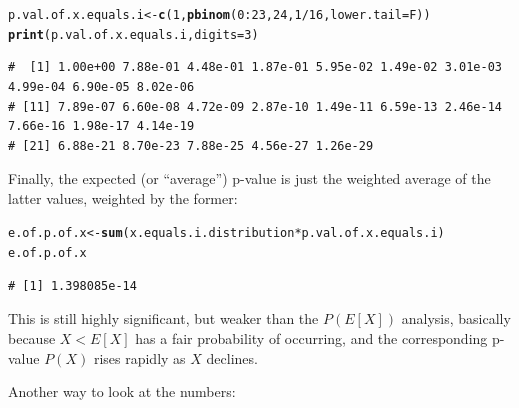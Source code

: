 \documentclass{article}\usepackage[]{graphicx}\usepackage[]{color}
\makeatletter
\newcommand{\hlnum}[1]{\textcolor[rgb]{0.686,0.059,0.569}{#1}}%
\newcommand{\hlopt}[1]{\textcolor[rgb]{0,0,0}{#1}}%
\newcommand{\hlstd}[1]{\textcolor[rgb]{0.345,0.345,0.345}{#1}}%
\newcommand{\hlkwb}[1]{\textcolor[rgb]{0.69,0.353,0.396}{#1}}%
\newcommand{\hlkwc}[1]{\textcolor[rgb]{0.333,0.667,0.333}{#1}}%
\newcommand{\hlkwd}[1]{\textcolor[rgb]{0.737,0.353,0.396}{\textbf{#1}}}%
\newenvironment{kframe}{%
 \def\at@end@of@kframe{}%
 \ifinner\ifhmode%
  \def\at@end@of@kframe{\end{minipage}}%
  \begin{minipage}{\columnwidth}%
 \fi\fi%
 \def\FrameCommand##1{\hskip\@totalleftmargin \hskip-\fboxsep
 \colorbox{shadecolor}{##1}\hskip-\fboxsep
     \hskip-\linewidth \hskip-\@totalleftmargin \hskip\columnwidth}%
 \MakeFramed {\advance\hsize-\width
   \@totalleftmargin\z@ \linewidth\hsize
   \@setminipage}}%
 {\par\unskip\endMakeFramed%
 \at@end@of@kframe}
\newenvironment{knitrout}{}{} %
\makeatother
\begin{document}
\begin{enumerate}
\begin{knitrout}\footnotesize
{}\color{fgcolor}\begin{kframe}
\begin{alltt}
\hlstd{p.val.of.x.equals.i} \hlkwb{<-} \hlkwd{c}\hlstd{(}\hlnum{1}\hlstd{,} \hlkwd{pbinom}\hlstd{(}\hlnum{0}\hlopt{:}\hlnum{23}\hlstd{,} \hlnum{24}\hlstd{,} \hlnum{1}\hlopt{/}\hlnum{16}\hlstd{,} \hlkwc{lower.tail} \hlstd{= F))}
\hlkwd{print}\hlstd{(p.val.of.x.equals.i,} \hlkwc{digits}\hlstd{=}\hlnum{3}\hlstd{)}
\end{alltt}
\begin{verbatim}
#  [1] 1.00e+00 7.88e-01 4.48e-01 1.87e-01 5.95e-02 1.49e-02 3.01e-03 4.99e-04 6.90e-05 8.02e-06
# [11] 7.89e-07 6.60e-08 4.72e-09 2.87e-10 1.49e-11 6.59e-13 2.46e-14 7.66e-16 1.98e-17 4.14e-19
# [21] 6.88e-21 8.70e-23 7.88e-25 4.56e-27 1.26e-29
\end{verbatim}
\end{kframe}
\end{knitrout}

Finally, the expected (or ``average'') p-value is just the weighted average of the latter values, weighted by the former:

\begin{knitrout}\footnotesize
{}\color{fgcolor}\begin{kframe}
\begin{alltt}
\hlstd{e.of.p.of.x} \hlkwb{<-} \hlkwd{sum}\hlstd{(x.equals.i.distribution} \hlopt{*} \hlstd{p.val.of.x.equals.i)}
\hlstd{e.of.p.of.x}
\end{alltt}
\begin{verbatim}
# [1] 1.398085e-14
\end{verbatim}
\end{kframe}
\end{knitrout}

This is still highly significant, but weaker than the $P(E[X])$ analysis, basically because $X<E[X]$ has a fair probability of occurring, and the corresponding p-value $P(X)$ rises rapidly as $X$ declines.

Another way to look at the numbers:


\end{enumerate}
\end{document}

